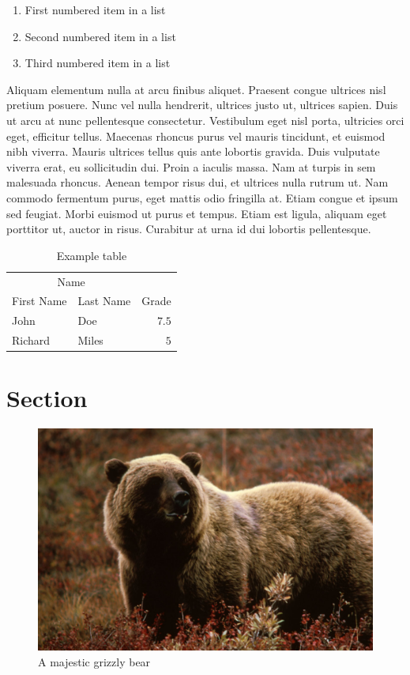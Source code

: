 \documentclass[10pt, a4paper, twocolumn]{article}
\begin{document}
\begin{enumerate}
	\item First numbered item in a list
	\item Second numbered item in a list
	\item Third numbered item in a list
\end{enumerate}

Aliquam elementum nulla at arcu finibus aliquet. Praesent congue ultrices nisl
pretium posuere. Nunc vel nulla hendrerit, ultrices justo ut, ultrices sapien.
Duis ut arcu at nunc pellentesque consectetur. Vestibulum eget nisl porta,
ultricies orci eget, efficitur tellus. Maecenas rhoncus purus vel mauris
tincidunt, et euismod nibh viverra. Mauris ultrices tellus quis ante lobortis
gravida. Duis vulputate viverra erat, eu sollicitudin dui. Proin a iaculis
massa. Nam at turpis in sem malesuada rhoncus. Aenean tempor risus dui, et
ultrices nulla rutrum ut. Nam commodo fermentum purus, eget mattis odio
fringilla at. Etiam congue et ipsum sed feugiat. Morbi euismod ut purus et
tempus. Etiam est ligula, aliquam eget porttitor ut, auctor in risus. Curabitur
at urna id dui lobortis pellentesque.

\begin{table}
	\caption{Example table}
	\centering
	\begin{tabular}{llr}
		\toprule
		\multicolumn{2}{c}{Name}       \\
		\cmidrule(r){1-2}
		First Name & Last Name & Grade \\
		\midrule
		John       & Doe       & $7.5$ \\
		Richard    & Miles     & $5$   \\
		\bottomrule
	\end{tabular}
\end{table}


\section{Section}

\begin{figure}
	\includegraphics[width=\linewidth]{bear.jpg}
	\caption{A majestic grizzly bear} %
	\label{bear} %
\end{figure}
\end{document}
